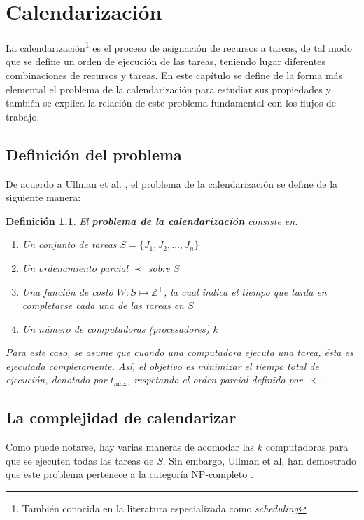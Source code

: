 \documentclass[letterpaper, 12pt]{report}
\newtheorem{defn}{Definición}
\begin{document}
\chapter{Calendarización}
La calendarización\footnote{También conocida en la literatura especializada como \emph{scheduling}} es el proceso de asignación de recursos a tareas, de tal modo que se define un orden de ejecución de las tareas, teniendo lugar diferentes combinaciones de recursos y tareas. En este capítulo se define de la forma más elemental el problema de la calendarización para estudiar sus propiedades y también se explica la relación de este problema fundamental con los flujos de trabajo.

\section{Definición del problema}
De acuerdo a  Ullman et al. \cite{ullman1975np}, el problema de la calendarización se define de la siguiente manera: 

\begin{defn}
El \textbf{problema de la calendarización} consiste en:
\begin{enumerate}
\item Un conjunto de tareas $S = \{ J_1, J_2, \dots, J_n \}$
\item Un ordenamiento parcial $\prec$ sobre $S$
\item Una función de costo $W: S \mapsto \mathbb{Z}^{+}$, la cual indica el tiempo que tarda en completarse cada una de las tareas en $S$
\item Un número de computadoras (procesadores) $k$
\end{enumerate}
Para este caso, se asume que cuando una computadora ejecuta una tarea, ésta es ejecutada completamente. Así, el objetivo es \emph{minimizar} el tiempo total de ejecución, denotado por $t_\text{max}$, respetando el orden parcial definido por $\prec$.
\end{defn}


\section{La complejidad de calendarizar}
Como puede notarse, hay varias maneras de acomodar las $k$ computadoras para que se ejecuten todas las tareas de $S$. Sin embargo, Ullman et al. han demostrado que este problema pertenece a la categoría NP-completo \cite{ullman1975np}.
\end{document}
